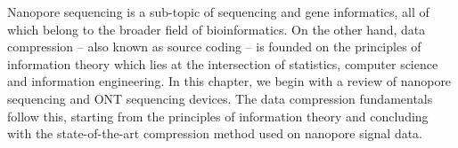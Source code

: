 Nanopore sequencing is a sub-topic of sequencing and gene informatics, all of
which belong to the broader field of bioinformatics. On the other hand, data
compression -- also known as source coding -- is founded on the principles of
information theory which lies at the intersection of statistics, computer
science and information engineering. In this chapter, we begin with a review of
nanopore sequencing and ONT sequencing devices.
The data compression fundamentals follow this, starting from the principles of
information theory and concluding with the state-of-the-art compression
method used on nanopore signal data.
